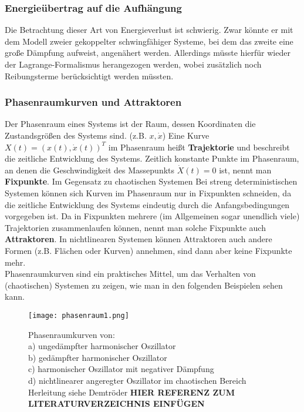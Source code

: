 \subsubsection{Energieübertrag auf die Aufhängung}

Die Betrachtung dieser Art von Energieverlust ist schwierig. Zwar könnte er mit dem Modell zweier gekoppelter schwingfähiger Systeme, bei dem das zweite eine große Dämpfung aufweist, angenähert werden. Allerdings müsste hierfür wieder der Lagrange-Formalismus herangezogen werden, wobei zusätzlich noch Reibungsterme berücksichtigt werden müssten. 



\subsubsection{Phasenraumkurven und Attraktoren}
Der Phasenraum eines Systems ist der Raum, dessen Koordinaten die Zustandsgrößen des Systems sind. (z.B. $x, \dot{x}$) Eine Kurve $X(t) = (x(t), \dot{x}(t))^T$ im Phasenraum heißt \textbf{Trajektorie} und beschreibt die zeitliche Entwicklung des Systems. Zeitlich konstante Punkte im Phasenraum, an denen die Geschwindigkeit des Massepunkts $\dot{X}(t) = 0$  ist, nennt man \textbf{Fixpunkte}. Im Gegensatz zu chaotischen Systemen Bei streng deterministischen Systemen können sich Kurven im Phasenraum nur in Fixpunkten schneiden, da die zeitliche Entwicklung des Systems eindeutig durch die Anfangsbedingungen vorgegeben ist. Da in Fixpunkten mehrere (im Allgemeinen sogar unendlich viele) Trajektorien zusammenlaufen können, nennt man solche Fixpunkte auch \textbf{Attraktoren}. In nichtlinearen Systemen können Attraktoren auch andere Formen (z.B. Flächen oder Kurven) annehmen, sind dann aber keine Fixpunkte mehr.
\\
Phasenraumkurven sind ein praktisches Mittel, um das Verhalten von (chaotischen) Systemen zu zeigen, wie man in den folgenden Beispielen sehen kann.

\begin{figure}
\texttt{[image: phasenraum1.png]}
\caption{Phasenraumkurven von: \\a) ungedämpfter harmonischer Oszillator \\b) gedämpfter harmonischer Oszillator \\c) harmonischer Oszillator mit negativer Dämpfung \\d) nichtlinearer angeregter Oszillator im chaotischen Bereich \\Herleitung siehe Demtröder \textbf{HIER REFERENZ ZUM LITERATURVERZEICHNIS EINFÜGEN}}
\end{figure}

